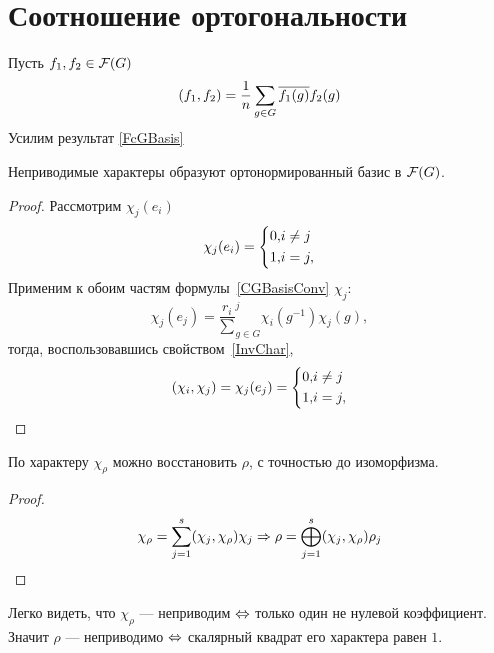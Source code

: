 \section{Соотношение ортогональности}
Пусть $f_1, f_2 \in \mathcal{F}(G)$
$$
	(f_1, f_2) = \frac 1 n \sum_{g \in G} \overline{f_1(g)} f_2(g)
$$
Усилим результат \autoref{FcGBasis}
\begin{stm}
	Неприводимые характеры образуют ортонормированный базис в $\mathcal{F}(G)$.
\end{stm}
\begin{proof}
	Рассмотрим $\chi_j(e_i)$
	$$
		\chi_j(e_i) = \left\{\begin{aligned}
					0, & i \ne j \\
					1, & i = j,
					\end{aligned}\right.
	$$
	Применим к обоим частям формулы~\ref{CGBasisConv} $\chi_j$:
	$$
		\chi_j(e_j) = \frac{r_i} \sum_{g \in G}^j \chi_i(g^{-1}) \chi_j(g),
	$$
	тогда, воспользовавшись свойством~\ref{InvChar},
	$$
		(\chi_i, \chi_j) = \chi_j(e_j) = \left\{\begin{aligned}
							0, & i \ne j \\
							1, & i = j,
							\end{aligned}\right.
	$$
\end{proof}
\begin{imp}
	По характеру $\chi_{\rho}$ можно восстановить $\rho$, с точностью до изоморфизма.
\end{imp}
\begin{proof}
	$$
		\chi_{\rho} = \sum_{j = 1}^s (\chi_j, \chi_{\rho}) \chi_j \Rightarrow 
		\rho = \bigoplus_{j = 1}^{s} (\chi_j, \chi_{\rho}) \rho_j
	$$
\end{proof}
Легко видеть, что $\chi_{\rho}$ --- неприводим $\Leftrightarrow$ только один не нулевой коэффициент.
Значит $\rho$ --- неприводимо $\Leftrightarrow$ скалярный квадрат его характера равен $1$.
